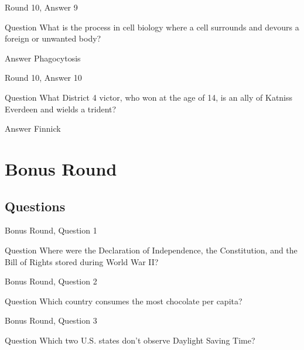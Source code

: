 \documentclass[11pt]{beamer}
\begin{document}
\begin{frame}{Round 10, Answer 9}
\begin{block}{Question}
What is the process in cell biology where a cell surrounds and devours a foreign or unwanted body\@?
\end{block}
\pause{}
\begin{block}{Answer}
Phagocytosis
\end{block}
\end{frame}
    

\begin{frame}{Round 10, Answer 10}
\begin{block}{Question}
What District 4 victor, who won at the age of 14, is an ally of Katniss Everdeen and wields a trident\@?
\end{block}
\pause{}
\begin{block}{Answer}
Finnick
\end{block}
\end{frame}
    

\section{Bonus Round}
    
\subsection{Questions}

\begin{frame}{Bonus Round, Question 1}
\begin{block}{Question}
Where were the Declaration of Independence, the Constitution, and the Bill of Rights stored during World War II\@?
\end{block}
\end{frame}
    

\begin{frame}{Bonus Round, Question 2}
\begin{block}{Question}
Which country consumes the most chocolate per capita\@?
\end{block}
\end{frame}
    

\begin{frame}{Bonus Round, Question 3}
\begin{block}{Question}
Which two U.S. states don't observe Daylight Saving Time\@?
\end{block}
\end{frame}
    
\end{document}
